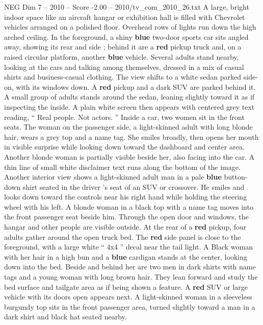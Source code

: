 \begin{textsample}{NEG Dim 7 – 2010 – Score -2.00 – 2010/tv\_com\_2010\_26.txt}  \label{ex:f7_neg_050}
A large, bright indoor space like an aircraft hangar or exhibition hall is filled with Chevrolet vehicles arranged on a polished floor.
Overhead rows of lights run down the high arched ceiling.
In the foreground, a shiny \textbf{blue} two-door sports car sits angled away, showing its rear and side ; behind it are a \textbf{red} pickup truck and, on a raised circular platform, another \textbf{blue} vehicle.
Several adults stand nearby, looking at the cars and talking among themselves, dressed in a mix of casual shirts and business-casual clothing.
The view shifts to a white sedan parked side-on, with its windows down.
A \textbf{red} pickup and a dark SUV are parked behind it.
A small group of adults stands around the sedan, leaning slightly toward it as if inspecting the inside.
A plain white screen then appears with centered grey text reading, “ Real people.
Not actors. ” Inside a car, two women sit in the front seats.
The woman on the passenger side, a light-skinned adult with long blonde hair, wears a grey top and a name tag.
She smiles broadly, then opens her mouth in visible surprise while looking down toward the dashboard and center area.
Another blonde woman is partially visible beside her, also facing into the car.
A thin line of small white disclaimer text runs along the bottom of the image.
Another interior view shows a light-skinned adult man in a pale \textbf{blue} button-down shirt seated in the driver ’s seat of an SUV or crossover.
He smiles and looks down toward the controls near his right hand while holding the steering wheel with his left.
A blonde woman in a black top with a name tag moves into the front passenger seat beside him.
Through the open door and windows, the hangar and other people are visible outside.
At the rear of a \textbf{red} pickup, four adults gather around the open truck bed.
The \textbf{red} side panel is close to the foreground, with a large white “ 4x4 ” decal near the tail light.
A Black woman with her hair in a high bun and a \textbf{blue} cardigan stands at the center, looking down into the bed.
Beside and behind her are two men in dark shirts with name tags and a young woman with long brown hair.
They lean forward and study the bed surface and tailgate area as if being shown a feature.
A \textbf{red} SUV or large vehicle with its doors open appears next.
A light-skinned woman in a sleeveless burgundy top sits in the front passenger area, turned slightly toward a man in a dark shirt and black hat seated nearby.

\end{textsample}
